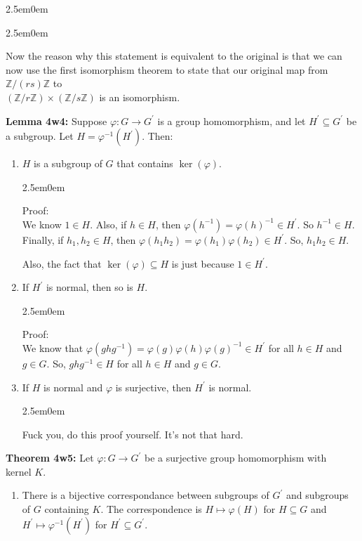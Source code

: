 \documentclass{book}
\newcommand{\hThree}{%
   \color{PineGreen!85!Orange}
   \fontsize{12}{14}\selectfont%
}
\newenvironment{myIndent}{%
   \begin{adjustwidth}{2.5em}{0em}%
}{%
   \end{adjustwidth}%
}
\newcommand{\blab}[1]{\textbf{#1}}
\newcommand{\retTwo}{\hfill\bigbreak}
\begin{document}
\begin{myIndent}
\begin{myIndent}
		Now the reason why this statement is equivalent to the original is that we can now use the first isomorphism theorem to state that our original map from $\mathbb{Z} / (rs)\mathbb{Z}$ to\\ $(\mathbb{Z} / r\mathbb{Z}) \times (\mathbb{Z} / s\mathbb{Z})$ is an isomorphism.\retTwo
	\end{myIndent}

	\blab{Lemma 4w4:} Suppose $\varphi: G \longrightarrow G^\prime$ is a group homomorphism, and let $H^\prime \subseteq G^\prime$ be a subgroup. Let $H = \varphi^{-1}(H^\prime)$. Then:
	\begin{enumerate}
		\item $H$ is a subgroup of $G$ that contains $\ker(\varphi)$.
		\begin{myIndent}\hThree
			Proof:\\
			We know $1 \in H$. Also, if $h \in H$, then $\varphi(h^{-1}) = \varphi(h)^{-1} \in H^\prime$. So $h^{-1} \in H$. Finally, if $h_1, h_2 \in H$, then $\varphi(h_1h_2) = \varphi(h_1)\varphi(h_2) \in H^\prime$. So, $h_1h_2 \in H$.\retTwo

			Also, the fact that $\ker(\varphi) \subseteq H$ is just because $1 \in H^\prime$.\retTwo
		\end{myIndent}

		\item If $H^\prime$ is normal, then so is $H$.
		\begin{myIndent}\hThree
			Proof:\\
			We know that $\varphi(ghg^{-1}) = \varphi(g)\varphi(h)\varphi(g)^{-1} \in H^\prime$ for all $h \in H$ and $g \in G$. So, $ghg^{-1} \in H$ for all $h \in H$ and $g \in G$.\newpage
		\end{myIndent}

		\item If $H$ is normal and $\varphi$ is surjective, then $H^\prime$ is normal.
		\begin{myIndent}\hThree
			Fuck you, do this proof yourself. It's not that hard.\retTwo
		\end{myIndent}
	\end{enumerate}

	\blab{Theorem 4w5:} Let $\varphi: G \longrightarrow G^\prime$ be a surjective group homomorphism with\\ kernel $K$.
	\begin{enumerate}
		\item There is a bijective correspondance between subgroups of $G^\prime$ and subgroups of $G$ containing $K$. The correspondence is $H \mapsto \varphi(H)$ for $H \subseteq G$ and\\ $H^\prime \mapsto \varphi^{-1}(H^\prime)$ for $H^\prime \subseteq G^\prime$.
	\end{enumerate}
\end{myIndent}
\end{document}
